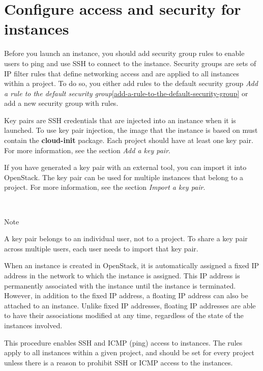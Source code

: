 \chapter{Configure access and security for instances}

Before you launch an \gls{instance}, you should add security group rules to
enable users to ping and use SSH to connect to the instance. Security
groups are sets of IP filter rules that define networking access and are
applied to all instances within a project. To do so, you either add
rules to the default security group
{\emph{Add a rule to the default security group}\ref{add-a-rule-to-the-default-security-group}} or add a new security group with
rules.

Key pairs are SSH credentials that are injected into an instance when it
is launched. To use key pair injection, the image that the instance is
based on must contain the \textbf{cloud-init} package. Each project
should have at least one key pair. For more information, see the section
{\emph{Add a key pair}}.

If you have generated a key pair with an external tool, you can import
it into \gls{OpenStack}. The key pair can be used for multiple instances that
belong to a project. For more information, see the section
{\emph{Import a key pair}}.

~

Note

A key pair belongs to an individual user, not to a project. To share a
key pair across multiple users, each user needs to import that key pair.

When an instance is created in \gls{OpenStack}, it is automatically assigned a
fixed IP address in the network to which the instance is assigned. This
IP address is permanently associated with the instance until the
instance is terminated. However, in addition to the fixed IP address, a
floating IP address can also be attached to an instance. Unlike fixed IP
addresses, floating IP addresses are able to have their associations
modified at any time, regardless of the state of the instances involved.

\label{add-a-rule-to-the-default-security-group}

This procedure enables SSH and ICMP (ping) access to instances. The
rules apply to all instances within a given project, and should be set
for every project unless there is a reason to prohibit SSH or ICMP
access to the instances.

